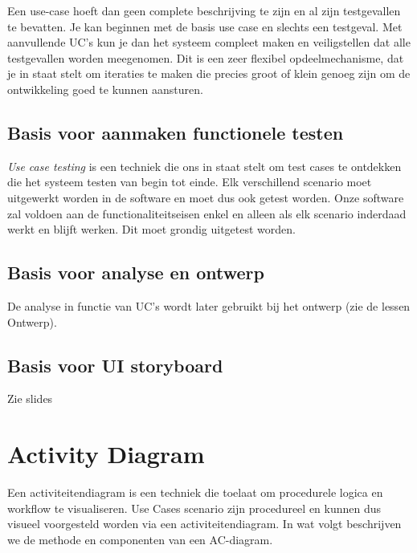 Een use-case hoeft dan geen complete beschrijving te zijn en al zijn testgevallen te bevatten. Je kan beginnen met de basis use case en slechts een testgeval. Met aanvullende UC's kun je dan het systeem compleet maken en veiligstellen dat alle testgevallen worden meegenomen. Dit is een zeer
flexibel opdeelmechanisme, dat je in staat stelt om iteraties te maken die precies groot of klein genoeg zijn
om de ontwikkeling goed te kunnen aansturen.


\subsection{Basis voor aanmaken functionele testen}
\textit{Use case testing} is een techniek die ons in staat stelt om test cases te ontdekken die het systeem testen van begin tot einde. Elk verschillend scenario moet uitgewerkt worden in de software en moet dus ook getest worden. Onze software zal voldoen aan de functionaliteitseisen enkel en alleen als elk scenario inderdaad werkt en blijft werken. Dit moet grondig uitgetest worden.


\subsection{Basis voor analyse en ontwerp}
De analyse in functie van UC's wordt later gebruikt bij het ontwerp (zie de lessen Ontwerp).

\subsection{Basis voor UI storyboard}
Zie slides

\section{Activity Diagram}
Een activiteitendiagram is een techniek die toelaat om procedurele logica en workflow te visualiseren. Use Cases scenario zijn procedureel en kunnen dus visueel voorgesteld worden via een activiteitendiagram.
In wat volgt beschrijven we de methode en componenten van een AC-diagram.


